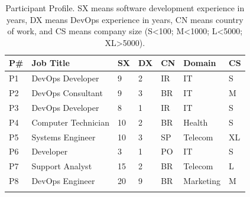 \begin{table}[h!]
\centering
\caption{Participant Profile. SX means software development experience in years,
DX means DevOps experience in years, CN means country of work, and CS means
company size (S\textless100; M\textless1000; L\textless5000; XL\textgreater5000).}
\label{participant_table}

\begin{tabular}{p{0.5cm}p{4cm}p{0.4cm}p{0.45cm}p{0.5cm}p{1.8cm}p{0.3cm}} \toprule \centering
\textbf{P\#}          & \textbf{Job Title}
       & \textbf{SX} & \textbf{DX} & \textbf{CN}   & \textbf{Domain}    & \multicolumn{1}{l}{\textbf{CS}} \\ \midrule \centering
P1                   & DevOps Developer      & 9            & 2           & IR            & IT                 & S                               \\ \centering

P2                   & DevOps Consultant       & 9            & 3           & BR            & IT                 & M                               \\ \centering

P3                   & DevOps Developer      & 8            & 1           & IR            & IT                 & S                               \\ \centering

P4                   & Computer Technician        & 10           & 2           & BR            & Health             & S                               \\ \centering

P5                   & Systems Engineer      & 10           & 3           & SP            & Telecom            & XL                              \\ \centering

P6                   & Developer             & 3            & 1           & PO            & IT                 & S                               \\ \centering

P7                   & Support Analyst       & 15           & 2           & BR            & Telecom            & L                               \\ \centering

P8                   & DevOps Engineer       & 20           & 9           & BR            & Marketing              & M                               \\ \centering


\end{tabular}
\end{table}
